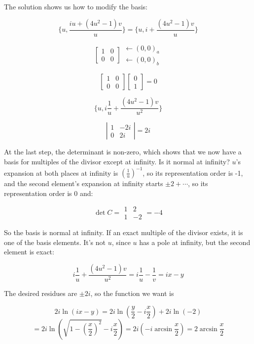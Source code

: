 The solution shows us how to modify the basis:

$$\{u, \frac{iu + (4u^2-1)v}{u}\} = \{u, i + \frac{(4u^2-1)v}{u}\}$$

$$\left[ \begin{array}{cc} 1 & 0 \\ 0 & 0 \end{array} \right] \begin{array}{ll} \leftarrow (0,0)_a \\ \leftarrow (0,0)_b \end{array} $$

$$\left[ \begin{array}{cc} 1 & 0 \\ 0 & 0 \end{array} \right] \left[ \begin{array}{c} 0 \\ 1 \end{array} \right] = 0$$

$$\{u, i\frac{1}{u} + \frac{(4u^2-1)v}{u^2}\}$$

$$\left| \begin{array}{cc} 1 & -2i \\ 0 & 2i \end{array} \right| = 2i$$

At the last step, the determinant is non-zero, which shows that we
now have a basis for multiples of the divisor except at infinity.
Is it normal at infinity?  $u$'s expansion at both places at infinity
is $\left(\frac{1}{u}\right)^{-1}$, so its representation order is -1,
and the second element's expansion at infinity starts $\pm 2 + \cdots$,
so its representation order is 0 and:

$$\det C = \begin{array}{|cc|} 1 & 2 \\ 1 & -2 \end{array} = -4$$

So the basis is normal at infinity.  If an exact multiple of
the divisor exists, it is one of the basis elements.  It's not $u$,
since $u$ has a pole at infinity, but the second element is exact:

$$i\frac{1}{u} + \frac{(4u^2-1)v}{u^2} = i\frac{1}{u} - \frac{1}{v} = ix-y$$

The desired residues are $\pm 2i$, so the function we want is

$$2i \ln(ix-y) = 2i \ln(\frac{y}{2}-i\frac{x}{2}) + 2i \ln(-2) $$
$$= 2i \ln\left(\sqrt{1-\left(\frac{x}{2}\right)^2} - i\frac{x}{2}\right) = 2i (-i \arcsin \frac{x}{2}) = 2 \arcsin \frac{x}{2}$$

